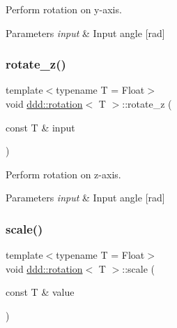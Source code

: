 Perform rotation on y-\/axis. 


\begin{DoxyParams}{Parameters}
{\em input} & Input angle \mbox{[}rad\mbox{]} \\
\hline
\end{DoxyParams}
\mbox{\label{classddd_1_1rotation_a3ef52c0cd324e1ef83fcb65dba746e10}} 
\subsubsection{\texorpdfstring{rotate\+\_\+z()}{rotate\_z()}}
{\footnotesize\ttfamily template$<$typename T  = Float$>$ \\
void \hyperlink{classddd_1_1rotation}{ddd\+::rotation}$<$ T $>$\+::rotate\+\_\+z (\begin{DoxyParamCaption}\item[{const T \&}]{input }\end{DoxyParamCaption})\hspace{0.3cm}{\ttfamily [inline]}}



Perform rotation on z-\/axis. 


\begin{DoxyParams}{Parameters}
{\em input} & Input angle \mbox{[}rad\mbox{]} \\
\hline
\end{DoxyParams}
\mbox{\label{classddd_1_1rotation_ab4911ee3dd5709e25f6dc7db6bad2c21}} 
\subsubsection{\texorpdfstring{scale()}{scale()}}
{\footnotesize\ttfamily template$<$typename T  = Float$>$ \\
void \hyperlink{classddd_1_1rotation}{ddd\+::rotation}$<$ T $>$\+::scale (\begin{DoxyParamCaption}\item[{const T \&}]{value }\end{DoxyParamCaption})\hspace{0.3cm}{\ttfamily [inline]}}



